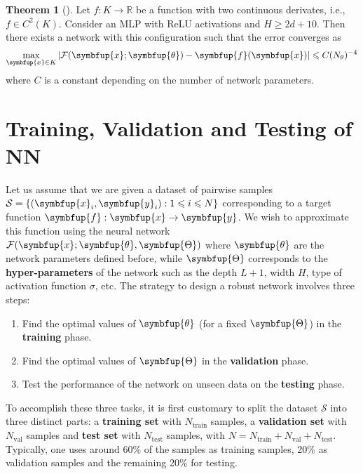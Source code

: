 \documentclass[11pt]{extarticle}
\newcommand{\ds}{\displaystyle}
\newcommand{\vf}{\symbfup{f}}
\newcommand{\vx}{\symbfup{x}}
\newcommand{\vy}{\symbfup{y}}
\theoremstyle{definition}
\newcommand{\btheta}{\symbfup{\theta}}
\newcommand{\Hp}{\symbfup{\Theta}}
\newcommand{\Ro}{\mathbb{R}}           	                %
\newtheorem{theorem}{Theorem}%
\begin{document}
\begin{theorem}[\cite{Yarotsky2021}]
Let $f:K \to \Ro$ be a function with two continuous derivates, i.e., $f \in C^2(K)$. Consider an MLP with ReLU activations and $H \geqslant 2d + 10$. Then there exists a network with this configuration such that the error converges as
\begin{align*}
\max_{\vx \in K}  |\mathcal{F}(\vx;\btheta) - \vf(\vx)| \leqslant C(N_\theta)^{-4}
\end{align*} 
where $C$ is a constant depending on the number of network parameters.
\end{theorem}

\newpage


\section*{Training, Validation and Testing of NN}

Let us assume that we are given a dataset of pairwise samples $\mathcal{S} = \{(\vx_i,\vy_i): 1 \leqslant i \leqslant N\}$ corresponding to a target function $\vf: \vx\to\vy$. We wish to approximate this function using the neural network $\ds\mathcal{F}(\vx; \btheta, \Hp)$
where $\btheta$ are the network parameters defined before, while $\Hp$ corresponds to the \textbf{hyper-parameters} of the network such as the depth $L+1$, width $H$, type of activation function $\sigma$, etc. The strategy to design a robust network involves three steps:
\begin{enumerate}
\item Find the optimal values of $\btheta$ (for a fixed $\Hp$)  in the \textbf{training} phase.
\item Find the optimal values of $\Hp$ in the \textbf{validation} phase.
\item Test the performance of the network on unseen data on the \textbf{testing} phase.
\end{enumerate}

To accomplish these three tasks, it is first customary to split the dataset $\mathcal{S}$ into three distinct parts: a \textbf{training set} with $N_{\text{train}}$ samples, a \textbf{validation set} with $N_{\text{val}}$ samples and \textbf{test set} with $N_{\text{test}}$ samples, with $N = N_{\text{train}} + N_{\text{val}} + N_{\text{test}}$. Typically, one uses around 60\% of the samples as training samples, 20\% as validation samples and the remaining 20\% for testing. 
\end{document}
